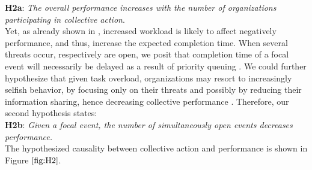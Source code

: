 \documentclass[unnumsec,webpdf,contemporary,large]{oup-authoring-template}%
\theoremstyle{thmstyleone}%
\theoremstyle{thmstyletwo}%
\theoremstyle{thmstylethree}%
\begin{document}
\textbf{H2a}: \textit{The overall performance increases with the number of organizations participating in collective action}.\\

Yet, as already shown in \cite{kuypers_designing_2018}, increased workload is likely to affect negatively performance, and thus, increase the expected completion time. When several threats occur, respectively are open, we posit that completion time of a focal event will necessarily be delayed as a result of priority queuing \cite{maillart_quantification_2011}. We could further hypothesize that given task overload, organizations may resort to increasingly  selfish behavior, by focusing only on their threats and possibly by reducing their information sharing, hence decreasing collective performance \cite{laube_strategic_2017, KOUTSOUPIAS200965}. Therefore, our second hypothesis states:\\

\textbf{H2b}: \textit{Given a focal event, the number of simultaneously open events decreases performance.}\\

\noindent
The hypothesized causality between collective action and performance is shown in Figure $\ref{fig:H2}$.
\end{document}
